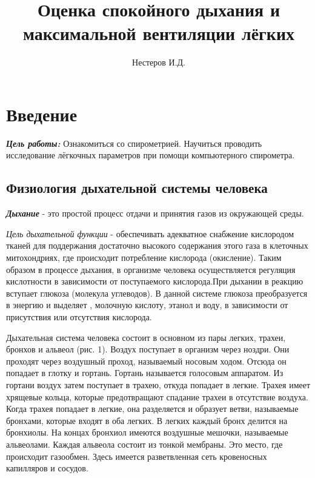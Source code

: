 \documentclass{article}
\title{Оценка спокойного дыхания и максимальной вентиляции лёгких}
\author{Нестеров И.Д.}
\date{}
\begin{document}
    \maketitle
    \tableofcontents
    \newpage

    \section*{Введение}

        \hspace*{4mm}\textbf{\textit{Цель работы:}} Ознакомиться со спирометрией.
        Научиться проводить исследование лёгкочных параметров при помощи компьютерного спирометра.

        \subsection*{Физиология дыхательной системы человека}

            \hspace*{4mm}\textbf{\textit{Дыхание}} - это простой процесс отдачи и принятия газов из окружающей
            среды.
            \vspace*{4mm}

            \textit{Цель дыхательной функции} - обеспечивать адекватное снабжение
            кислородом тканей для поддержания достаточно высокого содержания этого газа
            в клеточных митохондриях, где происходит потребление кислорода (окисление).
            Таким образом в процессе дыхания, в организме человека осуществляется
            регуляция кислотности в зависимости от поступаемого кислорода.При дыхании
            в реакцию вступает глюкоза (молекула углеводов). В данной системе глюкоза
            преобразуется в энергию и выделяет , молочную кислоту, этанол и воду, в
            зависимости от присутствия или отсутствия кислорода.
            \vspace*{4mm}

            Дыхательная система человека состоит в основном из пары легких, трахеи,
            бронхов и альвеол (рис. 1). Воздух поступает в организм через ноздри. Они
            проходят через воздушный проход, называемый носовым ходом. Отсюда он
            попадает в глотку и гортань. Гортань называется голосовым аппаратом. Из
            гортани воздух затем поступает в трахею, откуда попадает в легкие. Трахея имеет
            хрящевые кольца, которые предотвращают спадание трахеи в отсутствие воздуха.
            Когда трахея попадает в легкие, она разделяется и образует ветви, называемые
            бронхами, которые входят в оба легких. В легких каждый бронх делится на
            бронхиолы. На концах бронхиол имеются воздушные мешочки, называемые
            альвеолами. Каждая альвеола состоит из тонкой мембраны. Это место, где
            происходит газообмен. Здесь имеется разветвленная сеть кровеносных
            капилляров и сосудов.
            \vspace*{4mm}
\end{document}
